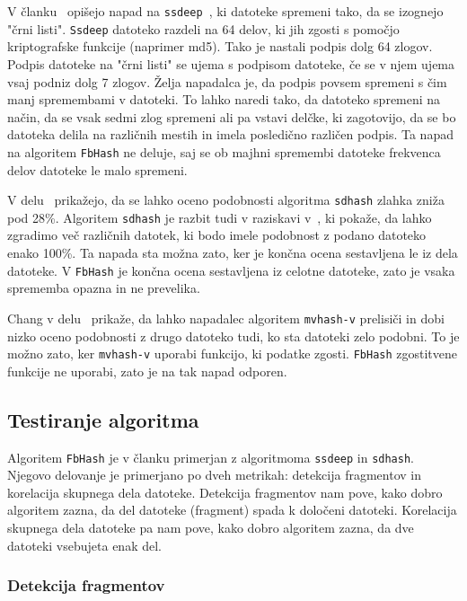 \documentclass{acm_proc_article-sp}
\begin{document}
V članku~\cite{5931110} opišejo napad na \texttt{ssdeep}~\cite{kornblum:ctph}, ki datoteke spremeni tako, da se izognejo "črni listi". \texttt{Ssdeep} datoteko razdeli na 64 delov, ki jih zgosti s pomočjo kriptografske funkcije (naprimer md5). Tako je nastali podpis dolg 64 zlogov. Podpis datoteke na "črni listi" se ujema s podpisom datoteke, če se v njem ujema vsaj podniz dolg 7 zlogov. Želja napadalca je, da podpis povsem spremeni s čim manj spremembami v datoteki. To lahko naredi tako, da datoteko spremeni na način, da se vsak sedmi zlog spremeni ali pa vstavi delčke, ki zagotovijo, da se bo datoteka delila na različnih mestih in imela posledično različen podpis. Ta napad na algoritem \texttt{FbHash} ne deluje, saj se ob majhni spremembi datoteke frekvenca delov datoteke le malo spremeni.

V delu~\cite{breitinger2012security} prikažejo, da se lahko oceno podobnosti algoritma \texttt{sdhash} zlahka zniža pod 28\%. Algoritem \texttt{sdhash} je razbit tudi v raziskavi v~\cite{chang2015collision}, ki pokaže, da lahko zgradimo več različnih datotek, ki bodo imele podobnost z podano datoteko enako 100\%. Ta napada sta možna zato, ker je končna ocena sestavljena le iz dela datoteke. V \texttt{FbHash} je končna ocena sestavljena iz celotne datoteke, zato je vsaka sprememba opazna in ne prevelika.

Chang v delu~\cite{chang2016security} prikaže, da lahko napadalec algoritem \texttt{mvhash-v} prelisiči in dobi nizko oceno podobnosti z drugo datoteko tudi, ko sta datoteki zelo podobni. To je možno zato, ker \texttt{mvhash-v} uporabi funkcijo, ki podatke zgosti. \texttt{FbHash} zgostitvene funkcije ne uporabi, zato je na tak napad odporen.

\subsection{Testiranje algoritma}
Algoritem \texttt{FbHash} je v članku primerjan z algoritmoma \texttt{ssdeep} in \texttt{sdhash}. Njegovo delovanje je primerjano po dveh metrikah: detekcija fragmentov in korelacija skupnega dela datoteke. Detekcija fragmentov nam pove, kako dobro algoritem zazna, da del datoteke (fragment) spada k določeni datoteki. Korelacija skupnega dela datoteke pa nam pove, kako dobro algoritem zazna, da dve datoteki vsebujeta enak del.

\subsubsection{Detekcija fragmentov}
\end{document}
